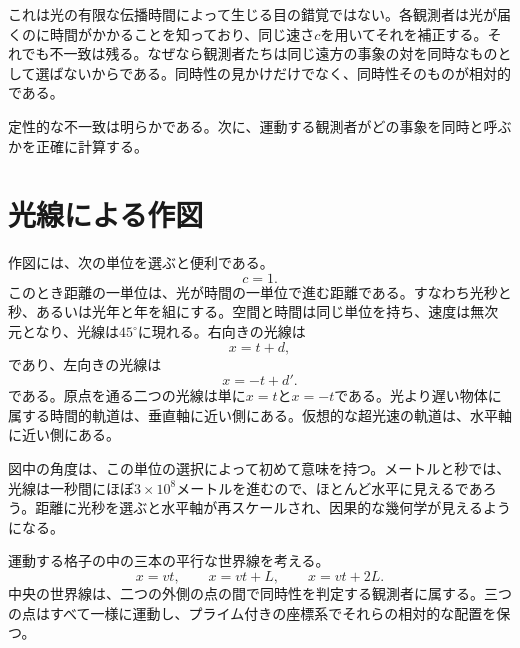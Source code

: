 これは光の有限な伝播時間によって生じる目の錯覚ではない。各観測者は光が届くのに時間がかかることを知っており、同じ速さ\(c\)を用いてそれを補正する。それでも不一致は残る。なぜなら観測者たちは同じ遠方の事象の対を同時なものとして選ばないからである。同時性の見かけだけでなく、同時性そのものが相対的である。

\begin{classroomqa}
\end{classroomqa}

定性的な不一致は明らかである。次に、運動する観測者がどの事象を同時と呼ぶかを正確に計算する。

\section{光線による作図}

作図には、次の単位を選ぶと便利である。
\begin{equation}
c=1.
\end{equation}
このとき距離の一単位は、光が時間の一単位で進む距離である。すなわち光秒と秒、あるいは光年と年を組にする。空間と時間は同じ単位を持ち、速度は無次元となり、光線は\(45^\circ\)に現れる。右向きの光線は
\begin{equation}
x=t+d,
\end{equation}
であり、左向きの光線は
\begin{equation}
x=-t+d'.
\end{equation}
である。原点を通る二つの光線は単に\(x=t\)と\(x=-t\)である。光より遅い物体に属する時間的軌道は、垂直軸に近い側にある。仮想的な超光速の軌道は、水平軸に近い側にある。

図中の角度は、この単位の選択によって初めて意味を持つ。メートルと秒では、光線は一秒間にほぼ\(3\times10^8\)メートルを進むので、ほとんど水平に見えるであろう。距離に光秒を選ぶと水平軸が再スケールされ、因果的な幾何学が見えるようになる。

運動する格子の中の三本の平行な世界線を考える。
\begin{equation}
x=vt,\qquad x=vt+L,\qquad x=vt+2L.
\label{eq:moving-worldlines}
\end{equation}
中央の世界線は、二つの外側の点の間で同時性を判定する観測者に属する。三つの点はすべて一様に運動し、プライム付きの座標系でそれらの相対的な配置を保つ。

